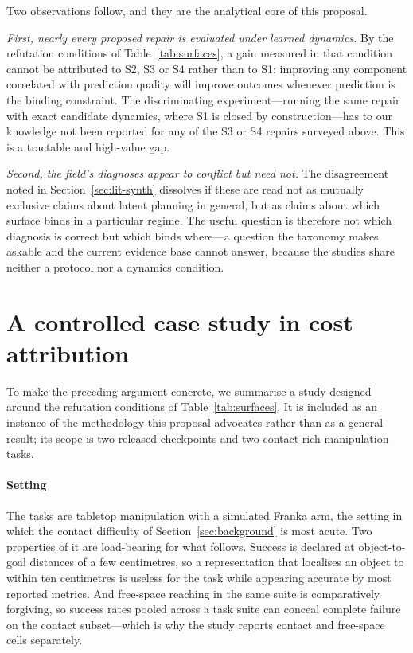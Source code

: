 \documentclass[11pt,letterpaper]{article}
\begin{document}
Two observations follow, and they are the analytical core of this proposal.

\emph{First, nearly every proposed repair is evaluated under learned dynamics.}
By the refutation conditions of Table~\ref{tab:surfaces}, a gain measured in that
condition cannot be attributed to S2, S3 or S4 rather than to S1: improving any
component correlated with prediction quality will improve outcomes whenever
prediction is the binding constraint. The discriminating experiment---running the
same repair with exact candidate dynamics, where S1 is closed by
construction---has to our knowledge not been reported for any of the S3 or S4
repairs surveyed above. This is a tractable and high-value gap.

\emph{Second, the field's diagnoses appear to conflict but need not.} The
disagreement noted in Section~\ref{sec:lit-synth} dissolves if these are read not
as mutually exclusive claims about latent planning in general, but as claims
about which surface binds in a particular regime. The useful question is
therefore not which diagnosis is correct but which binds where---a question the
taxonomy makes askable and the current evidence base cannot answer, because the
studies share neither a protocol nor a dynamics condition.

\section{A controlled case study in cost attribution}\label{sec:case}

To make the preceding argument concrete, we summarise a study designed around the
refutation conditions of Table~\ref{tab:surfaces}. It is included as an instance
of the methodology this proposal advocates rather than as a general result; its
scope is two released checkpoints and two contact-rich manipulation tasks.

\paragraph{Setting}
The tasks are tabletop manipulation with a simulated Franka arm, the setting in
which the contact difficulty of Section~\ref{sec:background} is most acute. Two
properties of it are load-bearing for what follows. Success is declared at
object-to-goal distances of a few centimetres, so a representation that localises
an object to within ten centimetres is useless for the task while appearing
accurate by most reported metrics. And free-space reaching in the same suite is
comparatively forgiving, so success rates pooled across a task suite can conceal
complete failure on the contact subset---which is why the study reports contact
and free-space cells separately.
\end{document}
